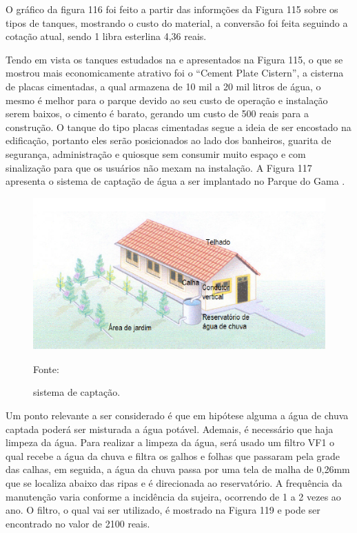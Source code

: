 O gráfico da figura 116 foi feito a partir das informções da Figura 115 sobre os tipos de tanques, mostrando o custo do material, a conversão foi feita seguindo a cotação atual, sendo 1 libra esterlina 4,36 reais.

Tendo em vista os tanques estudados na e apresentados na Figura 115, o que se mostrou mais economicamente atrativo foi o “Cement Plate Cistern”, a cisterna de placas cimentadas, a qual armazena de 10 mil a 20 mil litros de água, o mesmo é melhor para o parque devido ao seu custo de operação e instalação serem baixos, o cimento é barato, gerando um custo de 500 reais para a construção. O tanque do tipo placas cimentadas segue a ideia de ser encostado na edificação, portanto eles serão posicionados ao lado dos banheiros, guarita de segurança, administração e quiosque sem consumir muito espaço e com sinalização para que os usuários não mexam na instalação. A Figura 117 apresenta o sistema de captação de água a ser implantado no Parque do Gama \cite{gnadlinger1999technical}. 

\begin{figure}[H]
	 \centering
	\label{sistema de captação}
	 \includegraphics[scale=0.6]{captacao/9.png}
	 \caption{sistema de captação.}
	  \small{Fonte: \cite{WATERFALL}}
\end{figure}

Um ponto relevante a ser considerado é que em hipótese alguma a água de chuva captada poderá ser misturada a água potável. Ademais, é necessário que haja limpeza da água. Para realizar a limpeza da água, será usado um filtro VF1 o qual recebe a água da chuva e filtra os galhos e folhas que passaram pela grade das calhas, em seguida, a água da chuva passa por uma tela de malha de 0,26mm que se localiza abaixo das ripas e é direcionada ao reservatório. A frequência da manutenção varia conforme a incidência da sujeira, ocorrendo de 1 a 2 vezes ao ano. O filtro, o qual vai ser utilizado, é mostrado na Figura 119 e pode ser encontrado no valor de 2100 reais. 


